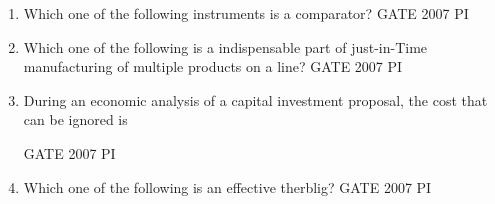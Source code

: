 \documentclass[journal,12pt,onecolumn]{IEEEtran}
\theoremstyle{remark}
\begin{document}
\begin{enumerate}
        \item 
        Which one of the following instruments is a comparator?
        \hfill{GATE 2007 PI}
        \begin{enumerate}
        \end{enumerate}
        
        \item 
        Which one of the following is a indispensable part of just-in-Time manufacturing of multiple products on a line?
        \hfill{GATE 2007 PI}
        \begin{enumerate}
        \end{enumerate}
    
        \item 
       	During an economic analysis of a capital investment proposal, the cost that can be ignored is


        \hfill{GATE 2007 PI}
        \begin{enumerate}
            \end{enumerate}
            
            \item 
            	Which one of the following is an effective therblig?
            \hfill{GATE 2007 PI}
            \begin{enumerate}
            \end{enumerate}
            

\end{enumerate}
\end{document}
